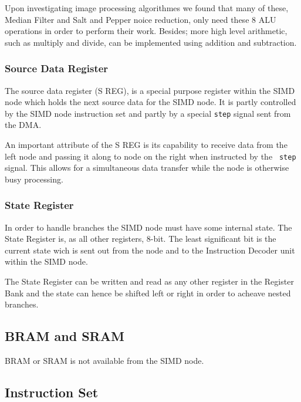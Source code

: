 Upon investigating image processing algorithmes we found that many of these,
Median Filter and Salt and Pepper noice reduction, only need these 8 \ac{ALU}
operations in order to perform their work. Besides; more high level arithmetic,
such as multiply and divide, can be implemented using addition and subtraction.

\subsubsection{Source Data Register}
The source data register (S REG), is a special purpose register within the
\ac{SIMD} node which holds the next source data for the \ac{SIMD} node. It is
partly controlled by the \ac{SIMD} node instruction set and partly by a special
{\tt step} signal sent from the \ac{DMA}.

An important attribute of the S REG is its capability to receive data from the
left node and passing it along to node on the right when instructed by the {\tt
  step} signal. This allows for a simultaneous data transfer while the node is
otherwise busy processing.

\subsubsection{State Register}
In order to handle branches the \ac{SIMD} node must have some internal
state. The State Register is, as all other registers, 8-bit. The least
significant bit is the current state wich is sent out from the node and to the
Instruction Decoder unit within the \ac{SIMD} node.

The State Register can be written and read as any other register in the Register
Bank and the state can hence be shifted left or right in order to acheave nested
branches.

\subsection{BRAM and SRAM}


\ac{BRAM} or \ac{SRAM} is not available from the \ac{SIMD} node.

\subsection{Instruction Set}



